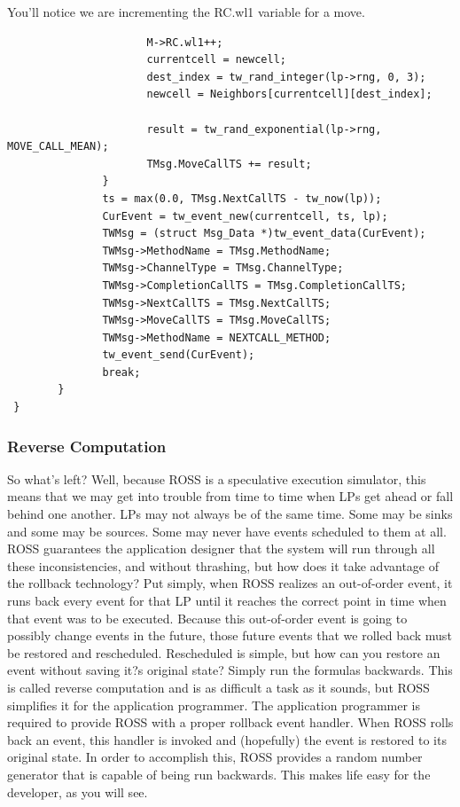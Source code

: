 \documentclass[12pt]{article}
\begin{document}
You'll notice we are incrementing the RC.wl1 variable for a move.

 
\begin{verbatim}
                      M->RC.wl1++;
                      currentcell = newcell;
                      dest_index = tw_rand_integer(lp->rng, 0, 3);
                      newcell = Neighbors[currentcell][dest_index];

                      result = tw_rand_exponential(lp->rng, MOVE_CALL_MEAN);
                      TMsg.MoveCallTS += result;
               }
               ts = max(0.0, TMsg.NextCallTS - tw_now(lp));
               CurEvent = tw_event_new(currentcell, ts, lp);
               TWMsg = (struct Msg_Data *)tw_event_data(CurEvent);
               TWMsg->MethodName = TMsg.MethodName;
               TWMsg->ChannelType = TMsg.ChannelType;
               TWMsg->CompletionCallTS = TMsg.CompletionCallTS;
               TWMsg->NextCallTS = TMsg.NextCallTS;
               TWMsg->MoveCallTS = TMsg.MoveCallTS;
               TWMsg->MethodName = NEXTCALL_METHOD;
               tw_event_send(CurEvent);
               break;
        }
 }
\end{verbatim}
 
\subsubsection{Reverse Computation}
So what's left?  Well, because ROSS is a speculative execution
simulator, this means that we may get into trouble from time to time
when LPs get ahead or fall behind one another.  LPs may not always be
of the same time.  Some may be sinks and some may be sources.  Some
may never have events scheduled to them at all.  ROSS guarantees the
application designer that the system will run through all these
inconsistencies, and without thrashing, but how does it take advantage
of the rollback technology?  Put simply, when ROSS realizes an
out-of-order event, it runs back every event for that LP until it
reaches the correct point in time when that event was to be executed.
Because this out-of-order event is going to possibly change events in
the future, those future events that we rolled back must be restored
and rescheduled.  Rescheduled is simple, but how can you restore an
event without saving it?s original state?  Simply run the formulas
backwards.  This is called reverse computation and is as difficult a
task as it sounds, but ROSS simplifies it for the application
programmer.  The application programmer is required to provide ROSS
with a proper rollback event handler.  When ROSS rolls back an event,
this handler is invoked and (hopefully) the event is restored to its
original state.  In order to accomplish this, ROSS provides a random
number generator that is capable of being run backwards.  This makes
life easy for the developer, as you will see.
 
\end{document}
